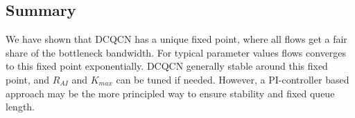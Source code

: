 \subsection{Summary}
We have shown that DCQCN has a unique fixed point, where all flows get a fair
share of the bottleneck bandwidth. For typical parameter values flows converges
to this fixed point exponentially.
DCQCN generally stable around this fixed
point, and $R_{AI}$ and $K_{max}$ can be tuned if needed.  However, a
PI-controller based approach may be the more principled way to ensure stability
and fixed queue length.
